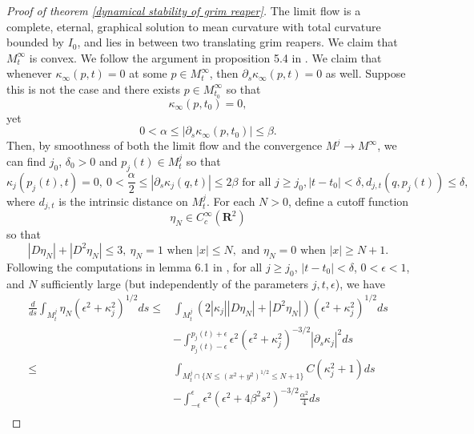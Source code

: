 \documentclass[pdflatex,sn-mathphys-num]{sn-jnl}%
\begin{document}
\begin{proof}[Proof of theorem \ref{dynamical stability of grim reaper}]
The limit flow is a complete, eternal, graphical solution to mean curvature with total curvature bounded by $I_0$, and lies in between two translating grim reapers. We claim that $M^{\infty}_t$ is convex. We follow the argument in proposition 5.4 in \cite{zhulectures}. We claim that whenever $\kappa_{\infty}(p,t) = 0$ at some $p \in M^{\infty}_t$, then $\partial_s\kappa_{\infty}(p,t) = 0$ as well. Suppose this is not the case and there exists $p \in M^{\infty}_{t_0}$ so that \begin{equation}
    \kappa_{\infty}(p, t_0)=0,
\end{equation} yet  
\begin{equation}
    0 < \alpha \leq |\partial_s\kappa_{\infty}(p,t_0)| \leq \beta.
\end{equation}
Then, by smoothness of both the limit flow and the convergence $M^j \to M^{\infty}$, we can find $j_0$, $\delta_0 > 0$ and $p_j(t) \in M^j_t$ so that
\begin{equation}\label{properties of appx nodal pts}
 \kappa_j(p_j(t), t) = 0 , \ 0 < \frac{\alpha}{2} \leq |\partial_s\kappa_j(q, t)| \leq 2\beta  \text{ for all }j \geq j_0, |t - t_0| < \delta, d_{j,t}(q, p_j(t)) \leq \delta,
\end{equation}
where $d_{j,t}$ is the intrinsic distance on $M^j_t$. For each $N > 0$, define a cutoff function
\begin{equation}
    \eta_N \in C_c^{\infty}(\mathbf{R}^2)
\end{equation}
so that 
\begin{equation}
|D\eta_N| + |D^2\eta_N| \leq 3, \ \eta_N = 1 \text{ when }|x| \leq N, \text{ and }\eta_N = 0 \text{ when }|x| \geq N+1.
\end{equation}
Following the computations in lemma 6.1 in \cite{zhulectures}, for all $j \geq j_0$, $|t - t_0| < \delta$, $0 < \epsilon<1 $, and $N$ sufficiently large (but independently of the parameters $j, t, \epsilon$), we have
\begin{align*}
 \frac{d}{ds}\int_{M^j_t}\eta_N(\epsilon^2 + \kappa_j^2)^{1/2}ds \leq &\int_{M^j_t}(2|\kappa_j||D\eta_N| + |D^2\eta_N|)(\epsilon^2 + \kappa_j^2)^{1/2}ds \\ &- \int_{p_j(t) -\epsilon}^{p_j(t) + \epsilon}\epsilon^2(\epsilon^2 + \kappa_j^2)^{-3/2}|\partial_s\kappa_j|^2ds \\ \leq & \int_{M^j_t \cap \{N \leq (x^2 + y^2)^{1/2} \leq N+1 \}}C(\kappa_j^2 +1)ds \\ & - \int_{-\epsilon}^{\epsilon}\epsilon^2(\epsilon^2 + 4\beta^2s^2)^{-3/2}\frac{\alpha^2}{4}ds \\

\end{align*}
\end{proof}
\end{document}

